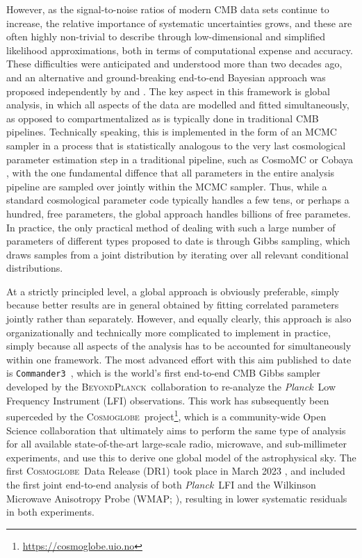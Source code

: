 \documentclass[twocolumn]{../common/aa}
\def\Planck{\emph{Planck}}
\def\commanderthree{\texttt{Commander3}}
\newcommand{\BP}{\textsc{BeyondPlanck}}
\newcommand{\cosmoglobe}{\textsc{Cosmoglobe}}
\begin{document}
However, as the signal-to-noise ratios of modern CMB data sets continue to increase, the relative importance of systematic uncertainties grows, and these are often highly non-trivial to describe through low-dimensional and simplified likelihood approximations, both in terms of computational expense and accuracy. These difficulties were anticipated and understood more than two decades ago, and an alternative and ground-breaking end-to-end Bayesian approach was proposed independently by \citet{jewell2004} and \citet{wandelt2004}. The key aspect in this framework is global analysis, in which all aspects of the data are modelled and fitted simultaneously, as opposed to compartmentalized as is typically done in traditional CMB pipelines. Technically speaking, this is implemented in the form of an MCMC sampler in a process that is statistically analogous to the very last cosmological parameter estimation step in a traditional pipeline, such as CosmoMC \citep{cosmomc} or Cobaya \citep{Torrado:2020dgo}, with the one fundamental diffence that all parameters in the entire analysis pipeline are sampled over jointly within the MCMC sampler. Thus, while a standard cosmological parameter code typically handles a few tens, or perhaps a hundred, free parameters, the global approach handles billions of free parametes. In practice, the only practical method of dealing with such a large number of parameters of different types proposed to date is through Gibbs sampling, which draws samples from a joint distribution by iterating over all relevant conditional distributions.

At a strictly principled level, a global approach is obviously preferable, simply because better results are in general obtained by fitting correlated parameters jointly rather than separately. However, and equally clearly, this approach is also organizationally and technically more complicated to implement in practice, simply because all aspects of the analysis has to be accounted for simultaneously within one framework. The most advanced effort with this aim published to date is \commanderthree\ \citet{bp05}, which is the world's first end-to-end CMB Gibbs sampler developed by the \BP\ collaboration to re-analyze the \Planck\ Low Frequency Instrument (LFI) observations. This work has subsequently been superceded by the \cosmoglobe\ project\footnote{\url{https://cosmoglobe.uio.no}}, which is a community-wide Open Science collaboration that ultimately aims to perform the same type of analysis for all available state-of-the-art large-scale radio, microwave, and sub-millimeter experiments, and use this to derive one global model of the astrophysical sky. The first \cosmoglobe\ Data Release (DR1) took place in March 2023 \citep{watts2023_dr1}, and included the first joint end-to-end analysis of both \Planck\ LFI and the Wilkinson Microwave Anisotropy Probe (WMAP; \citealp{bennett2012}), resulting in lower systematic residuals in both experiments.
\end{document}
